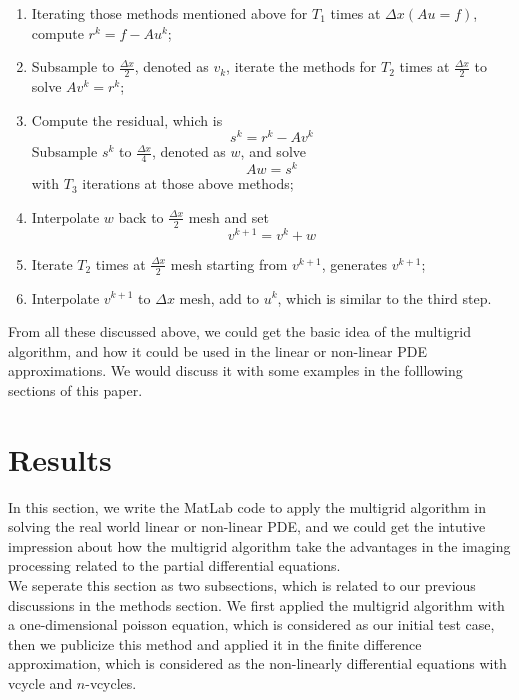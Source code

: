 \documentclass [a4paper, 12pt]{article}
\begin{document}
\begin {enumerate}
\item Iterating those methods mentioned above for $T_1$ times at $\Delta x (Au=f)$, compute $r^k=f-Au^k$; \\
\item Subsample to $\frac {\Delta x}
                                                                   {2}$,
denoted as $v_k$, iterate the methods for $T_2$ times at $\frac {\Delta x}
                                                                                                              {2}$
to solve $Av^k=r^k$; \\
\item Compute the residual, which is \\
\begin {equation}
      s^k=r^k-Av^k
\end {equation}
Subsample $s^k$ to $\frac {\Delta x}
                                              {4}$,
denoted as $w$, and solve \\
\begin {equation}
      Aw=s^k
\end {equation}
with $T_3$ iterations at those above methods; \\
\item Interpolate $w$ back to $\frac {\Delta x}
                                                                               {2}$
mesh and set \\
\begin {equation}
      v^{k+1}=v^k+w
\end {equation}
\item Iterate $T_2$ times at $\frac {\Delta x}
                                                                             {2}$
mesh starting from $v^{k+1}$, generates $v^{k+1}$; \\
\item Interpolate $v^{k+1}$ to $\Delta x$ mesh, add to $u^k$, which is similar to the third step. 
\end {enumerate}
From all these discussed above, we could get the basic idea of the multigrid algorithm, and how it could be used in the linear or non-linear PDE approximations. We would discuss it with some examples in the folllowing sections of this paper.

\section {Results}
In this section, we write the MatLab code to apply the multigrid algorithm in solving the real world linear or non-linear PDE, and we could get the intutive impression about how the multigrid algorithm take the advantages in the imaging processing related to the partial differential equations. \\
We seperate this section as two subsections, which is related to our previous discussions in the methods section. We first applied the multigrid algorithm with a one-dimensional poisson equation, which is considered as our initial test case, then we publicize this method and applied it in the finite difference approximation, which is considered as the non-linearly differential equations with vcycle and $n$-vcycles.\\
\end{document}

